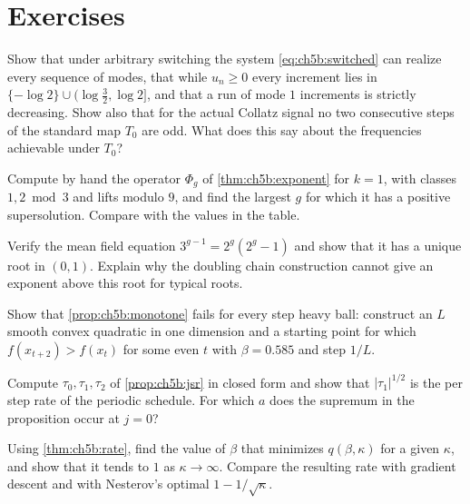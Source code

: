 \section*{Exercises}

\begin{exercise}
Show that under arbitrary switching the system \eqref{eq:ch5b:switched} can realize every sequence of modes, that while $u_n\ge0$ every increment lies in $\{-\log2\}\cup(\log\frac32,\log2]$, and that a run of mode $1$ increments is strictly decreasing. Show also that for the actual Collatz signal no two consecutive steps of the standard map $T_0$ are odd.
What does this say about the
frequencies achievable under $T_0$?
\end{exercise}

\begin{exercise}
Compute by hand the operator $\Phi_g$ of \cref{thm:ch5b:exponent} for $k=1$,
with classes $1,2\bmod3$ and lifts modulo $9$, and find the largest $g$ for
which it has a positive supersolution. Compare with the values in the table.
\end{exercise}

\begin{exercise}
Verify the mean field equation $3^{g-1}=2^g(2^g-1)$ and show that it has a
unique root in $(0,1)$. Explain why the doubling chain construction cannot give
an exponent above this root for typical roots.
\end{exercise}

\begin{exercise}
Show that \cref{prop:ch5b:monotone} fails for every step heavy ball: construct
an $L$ smooth convex quadratic in one dimension and a starting point for which
$f(x_{t+2})>f(x_t)$ for some even $t$ with $\beta=0.585$ and step $1/L$.
\end{exercise}

\begin{exercise}
Compute $\tau_0,\tau_1,\tau_2$ of \cref{prop:ch5b:jsr} in closed form and
show that $|\tau_1|^{1/2}$ is the per step rate of the periodic schedule. For
which $a$ does the supremum in the proposition occur at $j=0$?
\end{exercise}

\begin{exercise}
Using \cref{thm:ch5b:rate}, find the value of $\beta$ that minimizes $q(\beta,\kappa)$
for a given $\kappa$, and show that it tends to $1$ as $\kappa\to\infty$. Compare
the resulting rate with gradient descent and with Nesterov's optimal
$1-1/\sqrt\kappa$.
\end{exercise}
